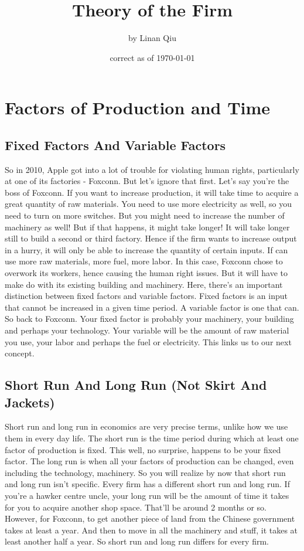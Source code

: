 \RequirePackage{../../dominatrix}

\title{Theory of the Firm}
\author{\large by Linan Qiu}
\date{\small correct as of \today}

\maketitle
\tableofcontents
\section{Factors of Production and Time}
\subsection{Fixed Factors And Variable Factors}
So in 2010, Apple got into a lot of trouble for violating human rights, particularly at one of its factories - Foxconn. But let's ignore that first. Let's say you're the boss of Foxconn. If you want to increase production, it will take time to acquire a great quantity of raw materials. You need to use more electricity as well, so you need to turn on more switches. But you might need to increase the number of machinery as well! But if that happens, it might take longer! It will take longer still to build a second or third factory. Hence if the firm wants to increase output in a hurry, it will only be able to increase the quantity of certain inputs. If can use more raw materials, more fuel, more labor. In this case, Foxconn chose to overwork its workers, hence causing the human right issues. But it will have to make do with its existing building and machinery. Here, there's an important distinction between fixed factors and variable factors. Fixed factors is an input that cannot be increased in a given time period. A variable factor is one that can. So back to Foxconn. Your fixed factor is probably your machinery, your building and perhaps your technology. Your variable will be the amount of raw material you use, your labor and perhaps the fuel or electricity. This links us to our next concept.
\subsection{Short Run And Long Run (Not Skirt And Jackets)}
Short run and long run in economics are very precise terms, unlike how we use them in every day life. The short run is the time period during which at least one factor of production is fixed. This well, no surprise, happens to be your fixed factor. The long run is when all your factors of production can be changed, even including the technology, machinery. So you will realize by now that short run and long run isn't specific. Every firm has a different short run and long run. If you're a hawker centre uncle, your long run will be the amount of time it takes for you to acquire another shop space. That'll be around 2 months or so. However, for Foxconn, to get another piece of land from the Chinese government takes at least a year. And then to move in all the machinery and stuff, it takes at least another half a year. So short run and long run differs for every firm.
